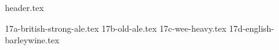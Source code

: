 \clearpage
{}
\divisorLine

{header.tex}

\begin{multicols}{2}

{17a-british-strong-ale.tex}
{17b-old-ale.tex}
{17c-wee-heavy.tex}
{17d-english-barleywine.tex}

\end{multicols}